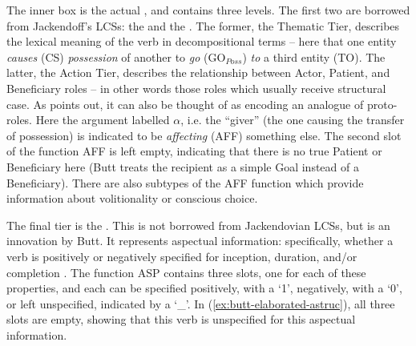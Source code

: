 \documentclass[output=paper]{langscibook}
\begin{document}

\noindent
The inner box is the actual \astruc{}, and contains three levels. The first two
are borrowed from Jackendoff's LCSs: the  and the . The former, the Thematic Tier, describes the lexical meaning of the
verb in decompositional terms -- here that one entity \emph{causes} (CS)
\emph{possession} of another to \emph{go} (GO$_\textit{Poss}$) \emph{to} a third
entity (TO).
%
The latter, the Action Tier, describes the relationship between Actor, Patient,
and Beneficiary roles -- in other words those roles which usually receive
structural case. As \citet[137]{Butt1995} points out, it can also be thought of
as encoding an analogue of  proto-roles. Here the argument
labelled $\alpha$, i.e. the ``giver'' (the one causing the transfer of
possession) is indicated to be \emph{affecting} (AFF) something else. The second
slot of the function AFF is left empty, indicating that there is no true Patient
or Beneficiary here (Butt treats the recipient as a simple Goal instead of a
Beneficiary). There are also subtypes of the AFF function which provide
information about volitionality or conscious choice.

The final tier is the . This is not borrowed from Jackendovian
LCSs, but is an innovation by Butt. It represents aspectual information:
specifically, whether a verb is positively or negatively specified for
inception, duration, and/or completion \citep[142]{Butt1995}. The function ASP
contains three slots, one for each of these properties, and each can be
specified positively, with a `1', negatively, with a `0', or left unspecified,
indicated by a `\_'. In (\ref{ex:butt-elaborated-astruc}), all three slots are
empty, showing that this verb is unspecified for this aspectual information.
\end{document}
